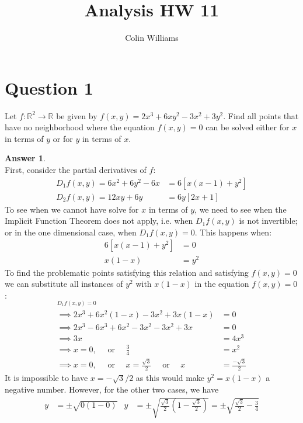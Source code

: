 \documentclass[10pt,a4paper]{article}
\title{Analysis HW 11}
\author{Colin Williams}
\theoremstyle{definition}
\newtheorem*{answer*}{Answer}
\theoremstyle{definition}
\numberwithin{equation}{section}
\begin{document}
\maketitle


\section*{Question 1}
Let $f: \mathbb{R}^2 \to \mathbb{R}$ be given by $f(x, y) = 2x^3 + 6xy^2 - 3x^2 + 3y^2$. Find all points that have no neighborhood where the equation $f(x, y) = 0$ can be solved either for $x$ in terms of $y$ or for $y$ in terms of $x$. 

\begin{answer*}$ $
\\First, consider the partial derivatives of $f$:
\begin{align*}
D_1f(x, y) = 6x^2 + 6y^2 - 6x &= 6[x(x - 1) + y^2]\\
D_2f(x, y) = 12xy + 6y &= 6y[2x + 1]
\end{align*}
To see when we cannot have solve for $x$ in terms of $y$, we need to see when the Implicit Function Theorem does not apply, i.e. when $D_1f(x, y)$ is not invertible; or in the one dimensional case, when $D_1f(x, y) = 0$. This happens when:
\begin{align*}
6[x(x-1) + y^2] &= 0\\
x(1 - x) &= y^2
\end{align*}
To find the problematic points satisfying this relation and satisfying $f(x, y) = 0$ we can substitute all instances of $y^2$ with $x(1 - x)$ in the equation $f(x, y) = 0$:
\begin{align*}
[f(x, y) &= 0]_{D_1f(x, y) = 0}\\
\implies 2x^3 + 6x^2(1 - x) - 3x^2 + 3x(1 - x) &= 0\\
\implies 2x^3 - 6x^3 + 6x^2 - 3x^2 - 3x^2 + 3x &= 0\\
\implies 3x &= 4x^3\\
\implies x = 0, \quad \text{ or } \quad \frac{3}{4} &= x^2\\
\implies x = 0, \quad \text{ or } \quad x = \frac{\sqrt{3}}{2} \quad \text{ or } \quad x &= \frac{-\sqrt{3}}{2}
\end{align*}
It is impossible to have $x = -\sqrt{3}/2$ as this would make $y^2 = x(1 - x)$ a negative number. However, for the other two cases, we have 
\begin{align*}
y &= \pm \sqrt{0(1 - 0)} & y &= \pm \sqrt{\frac{\sqrt{3}}{2}\left(1 - \frac{\sqrt{3}}{2}\right)} = \pm \sqrt{\frac{\sqrt{3}}{2} - \frac{3}{4}}\\

\end{align*}
\end{answer*}
\end{document}
